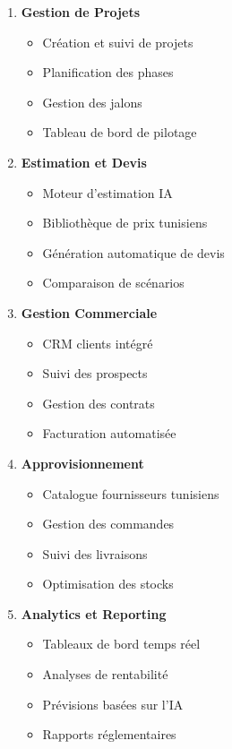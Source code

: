 \begin{enumerate}
    \item \textbf{Gestion de Projets}
    \begin{itemize}
        \item Création et suivi de projets
        \item Planification des phases
        \item Gestion des jalons
        \item Tableau de bord de pilotage
    \end{itemize}
    
    \item \textbf{Estimation et Devis}
    \begin{itemize}
        \item Moteur d'estimation IA
        \item Bibliothèque de prix tunisiens
        \item Génération automatique de devis
        \item Comparaison de scénarios
    \end{itemize}
    
    \item \textbf{Gestion Commerciale}
    \begin{itemize}
        \item CRM clients intégré
        \item Suivi des prospects
        \item Gestion des contrats
        \item Facturation automatisée
    \end{itemize}
    
    \item \textbf{Approvisionnement}
    \begin{itemize}
        \item Catalogue fournisseurs tunisiens
        \item Gestion des commandes
        \item Suivi des livraisons
        \item Optimisation des stocks
    \end{itemize}
    
    \item \textbf{Analytics et Reporting}
    \begin{itemize}
        \item Tableaux de bord temps réel
        \item Analyses de rentabilité
        \item Prévisions basées sur l'IA
        \item Rapports réglementaires
    \end{itemize}
\end{enumerate}

